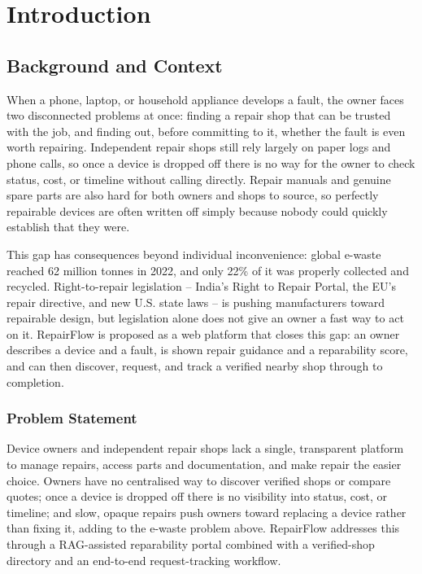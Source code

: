 \documentclass[11pt,a4paper]{report}
\begin{document}
\tableofcontents
\thispagestyle{empty}
\newpage

\chapter{Introduction}

\section{Background and Context}

When a phone, laptop, or household appliance develops a fault, the owner faces two disconnected problems at once: finding a repair shop that can be trusted with the job, and finding out, before committing to it, whether the fault is even worth repairing. Independent repair shops still rely largely on paper logs and phone calls, so once a device is dropped off there is no way for the owner to check status, cost, or timeline without calling directly. Repair manuals and genuine spare parts are also hard for both owners and shops to source, so perfectly repairable devices are often written off simply because nobody could quickly establish that they were.

This gap has consequences beyond individual inconvenience: global e-waste reached 62 million tonnes in 2022, and only 22\% of it was properly collected and recycled. Right-to-repair legislation -- India's Right to Repair Portal, the EU's repair directive, and new U.S. state laws -- is pushing manufacturers toward repairable design, but legislation alone does not give an owner a fast way to act on it. RepairFlow is proposed as a web platform that closes this gap: an owner describes a device and a fault, is shown repair guidance and a reparability score, and can then discover, request, and track a verified nearby shop through to completion.

\subsection{Problem Statement}

Device owners and independent repair shops lack a single, transparent platform to manage repairs, access parts and documentation, and make repair the easier choice. Owners have no centralised way to discover verified shops or compare quotes; once a device is dropped off there is no visibility into status, cost, or timeline; and slow, opaque repairs push owners toward replacing a device rather than fixing it, adding to the e-waste problem above. RepairFlow addresses this through a RAG-assisted reparability portal combined with a verified-shop directory and an end-to-end request-tracking workflow.
\end{document}
